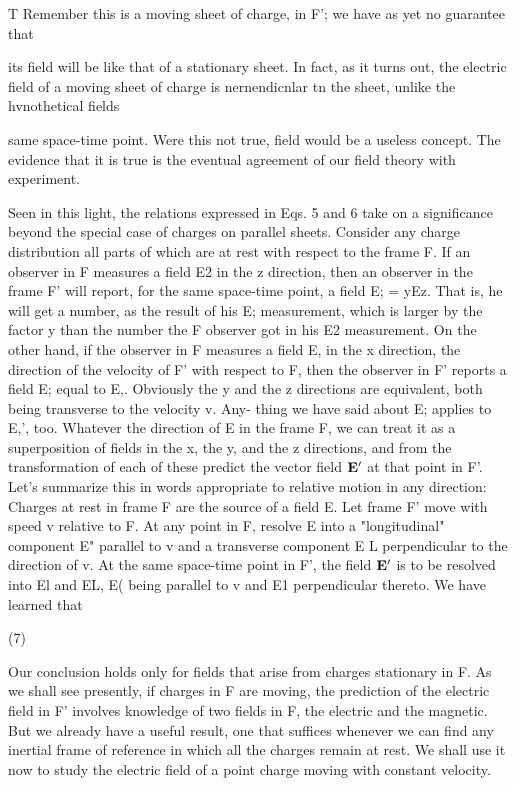 T Remember this is a moving sheet of charge, in F'; we have as yet no guarantee that

its field will be like that of a stationary sheet. In fact, as it turns out, the electric field
of a moving sheet of charge is nernendicnlar tn the sheet, unlike the hvnothetical fields

same space-time point. Were this not true, field would be a useless
concept. The evidence that it is true is the eventual agreement of
our field theory with experiment.

Seen in this light, the relations expressed in Eqs. 5 and 6 take on
a significance beyond the special case of charges on parallel sheets.
Consider any charge distribution all parts of which are at rest with
respect to the frame F. If an observer in F measures a field E2 in the
z direction, then an observer in the frame F' will report, for the same
space-time point, a field E; = yEz. That is, he will get a number, as
the result of his E; measurement, which is larger by the factor y than
the number the F observer got in his E2 measurement. On the
other hand, if the observer in F measures a field E, in the x direction,
the direction of the velocity of F' with respect to F, then the observer
in F' reports a field E; equal to E,. Obviously the y and the z directions
are equivalent, both being transverse to the velocity v. Any-
thing we have said about E; applies to E,', too. Whatever the direction
of E in the frame F, we can treat it as a superposition of fields in
the x, the y, and the z directions, and from the transformation of each
of these predict the vector field $\mathbf{E}'$ at that point in F'. Let's summarize
this in words appropriate to relative motion in any direction:
Charges at rest in frame F are the source of a field E. Let frame F'
move with speed v relative to F. At any point in F, resolve E into a
"longitudinal" component E" parallel to v and a transverse component
E L perpendicular to the direction of v. At the same space-time
point in F', the field $\mathbf{E}'$ is to be resolved into El and EL, E( being
parallel to v and E1 perpendicular thereto. We have learned that

\begin{equation}
\end{equation}
(7)

 

Our conclusion holds only for fields that arise from charges stationary
in F. As we shall see presently, if charges in F are moving, the prediction
of the electric field in F' involves knowledge of two fields in F,
the electric and the magnetic. But we already have a useful result,
one that suffices whenever we can find any inertial frame of reference
in which all the charges remain at rest. We shall use it now to study
the electric field of a point charge moving with constant velocity.

